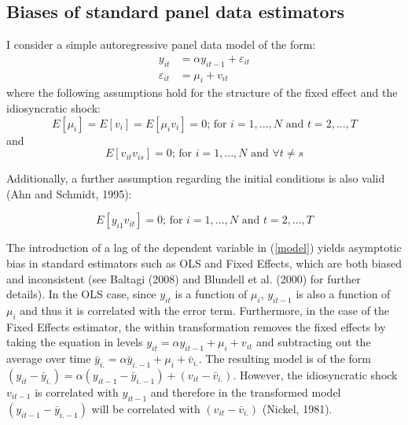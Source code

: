 \documentclass[a4paper, 12pt]{article}
\begin{document}
\subsection*{Biases of standard panel data estimators}

I consider a simple autoregressive panel data model of the form:
\begin{equation}
\label{modelar}
\tag{1'}
\begin{aligned}
y_{it}&=\alpha y_{it-1} + \varepsilon_{it}\\
\varepsilon_{it}&=\mu _{i}+v_{it}
\end{aligned}
\end{equation}
where the following assumptions hold for the structure of the fixed effect and the idiosyncratic shock:
\begin{equation}
\label{as1}
\tag{2'}
E\left[\mu_{i}\right]=E\left[v_{i}\right]=E\left[\mu_{i}v_i\right]=0\text{; for $i=1,...,N$ and $t=2,...,T$}
\end{equation}
and
\begin{equation}
\label{as2}
\tag{3'}
E\left[v_{it}v_{is}\right]=0\text{; for $i=1,...,N$ and $\forall t\neq s$}
\end{equation}

Additionally, a further assumption regarding the initial conditions is also valid (Ahn and Schmidt, 1995):

\begin{equation}
\label{as3}
\tag{4'}
E\left[y_{i1}v_{it}\right]=0\text{; for $i=1,...,N$ and $t=2,...,T$}
\end{equation}

The introduction of a lag of the dependent variable in (\ref{model}) yields asymptotic bias in standard estimators such as OLS and Fixed Effects, which are both biased and inconsistent (see Baltagi (2008) and Blundell et al. (2000) for further details). In the OLS case, since $y_{it}$ is a function of $\mu_{i}$, $y_{it-1}$ is also a function of $\mu_{i}$ and thus it is correlated with the error term. Furthermore, in the case of the Fixed Effects estimator, the within transformation removes the fixed effects by taking the equation in levels $y_{it}=\alpha y_{it-1} + \mu_i+v_{it}$ and subtracting out the average over time $\bar y_{i.}=\alpha \bar y_{i.-1} +\mu_i +\bar v_{i.}$. The resulting model is of the form $(y_{it}-\bar y_{i.})=\alpha (y_{it-1}-\bar y_{i.-1})+ (v_{it}-\bar v_{i.})$. However, the idiosyncratic shock $v_{it-1}$ is correlated with $y_{it-1}$ and therefore in the transformed model $(y_{it-1}-\bar y_{i.-1})$ will be correlated with $(v_{it}-\bar v_{i.})$ (Nickel, 1981).
\end{document}
